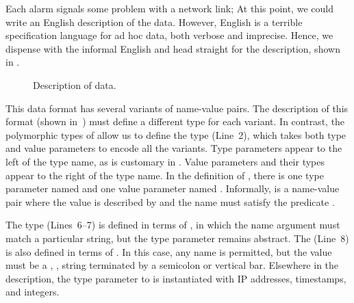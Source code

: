 Each alarm signals some problem with a network link; At this point, we
could write an English description of the \darkstar{} data. However,
English is a terrible specification language for ad hoc data, both
verbose and imprecise.  Hence, we dispense with the informal English
and head straight for the \padsml{} description, shown in
.

\begin{figure}
  \centering
  
  \caption{Description of \darkstar{} data.}
  \label{fig:darkstar-ml}
\end{figure}

This data format has several variants of name-value pairs. The
\padsc{} description of this format (shown in~)
must define a different type for each variant. In contrast, the
polymorphic types of \padsml{} allow us to define the type 
(Line~2), which takes both type and value parameters to encode all the
variants. Type parameters appear to the left of the type name, as is
customary in \ml{}.  Value parameters and their \ml{} types appear to
the right of the type name.  In the definition of , there is
one type parameter named  and one value parameter named
.  Informally,  is a name-value pair where the
value is described by  and the name must satisfy the
predicate .

The  type (Lines~6--7) is defined in terms of , in
which the name argument must match a particular string, but the type
parameter remains abstract.  The  (Line~8) is also defined
in terms of .  In this case, any name is permitted, but the
value must be a , \ie{}, string terminated by a semicolon
or vertical bar.  Elsewhere in the description, the type parameter to
 is instantiated with IP addresses, timestamps, and integers.


